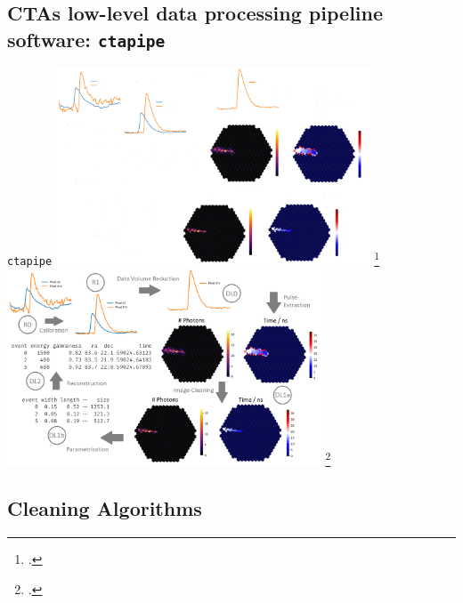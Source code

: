 \subsection{CTAs low-level data processing pipeline software: \texttt{ctapipe}}
\begin{frame}{\texttt{ctapipe}}
  \centering
  \ifdefined\darktheme
    \includegraphics[width=0.7\textwidth]{graphics/ctapipe_darktheme.png}
    \footcite{hackfeld}
  \else
    \includegraphics[width=0.7\textwidth]{graphics/ctapipe.png}
    \footcite{hackfeld}
  \fi
\end{frame}

\subsection{Cleaning Algorithms}
\ifdefined\darktheme
  
\else
  
\fi